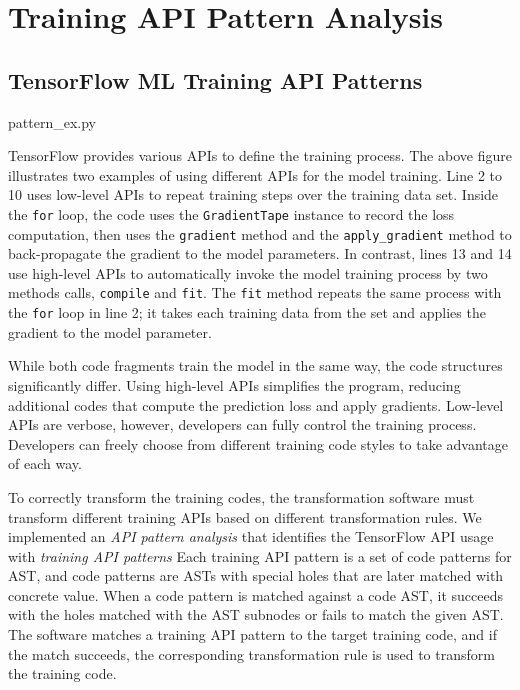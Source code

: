 \section{Training API Pattern Analysis}\label{sec:pattern}

\subsection{TensorFlow ML Training API Patterns}


{pattern_ex.py}

TensorFlow provides various APIs to define the training process.
The above figure illustrates two examples of using 
different APIs for the model training.
Line 2 to 10 uses low-level APIs to repeat training steps over the training
data set. Inside the {\tt for} loop, 
the code uses the {\tt GradientTape} instance to record the loss computation,
then uses the {\tt gradient} method and the {\tt apply\_gradient} method to
back-propagate the gradient to the model parameters.
In contrast, lines 13 and 14 use high-level APIs to automatically
invoke the model training process by two methods calls, {\tt compile} and
{\tt fit}. The {\tt fit} method repeats the same process with the {\tt for}
loop in line 2; it takes each training data from the set and
applies the gradient to the model parameter.

While both code fragments train the model in the same way, 
the code structures significantly differ.
Using high-level APIs simplifies the program,
reducing additional codes that compute the prediction loss and apply gradients.
Low-level APIs are verbose, however, developers can fully control
the training process.
Developers can freely choose from different training code styles to
take advantage of each way.

To correctly transform the training codes,
the transformation software must transform different training APIs
based on different transformation rules. 
We implemented an \textit{API pattern analysis} that identifies
the TensorFlow API usage with \textit{training API patterns} 
Each training API pattern is a set of code patterns for AST,
and code patterns are ASTs with
special holes that are later matched with concrete value.
When a code pattern is matched against a code AST,
it succeeds with the holes matched with the AST subnodes
or fails to match the given AST.
The software matches a training API pattern to the target training code,
and if the match succeeds, the corresponding transformation rule
is used to transform the training code.

